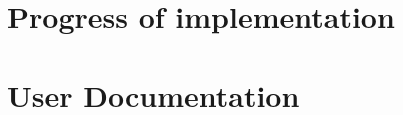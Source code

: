 \documentclass[12pt,a4paper]{report}
\begin{document}
\part{Progress of implementation}









\part{User Documentation}










\end{document}
